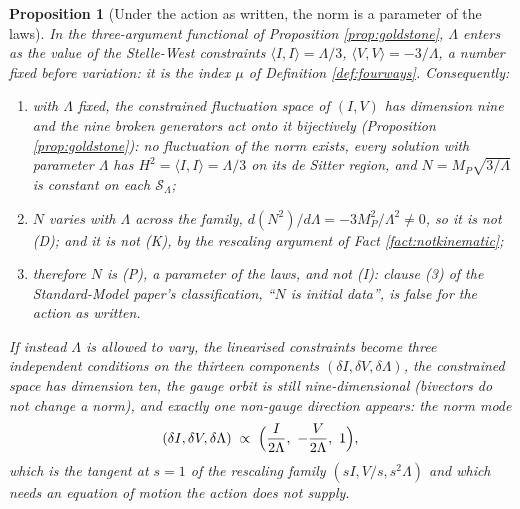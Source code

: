 \documentclass[11pt]{article}
\newtheorem{proposition}[theorem]{Proposition}
\theoremstyle{definition}
\newcommand{\ip}[2]{\langle #1, #2\rangle}
\begin{document}
\begin{proposition}[Under the action as written, the norm is a parameter of the laws]\label{prop:parameter}
In the three-argument functional of Proposition \ref{prop:goldstone}, $\Lambda$ enters as the value of the Stelle-West constraints $\ip{I}{I} = \Lambda/3$, $\ip{V}{V} = -3/\Lambda$, a number fixed before variation: it is the index $\mu$ of Definition \ref{def:fourways}. Consequently:
\begin{enumerate}
\item[(i)] with $\Lambda$ fixed, the constrained fluctuation space of $(I, V)$ has dimension nine and the nine broken generators act onto it bijectively (Proposition \ref{prop:goldstone}): no fluctuation of the norm exists, every solution with parameter $\Lambda$ has $H^2 = \ip{I}{I} = \Lambda/3$ on its de Sitter region, and $N = M_P\sqrt{3/\Lambda}$ is constant on each $\mathcal{S}_\Lambda$;
\item[(ii)] $N$ varies with $\Lambda$ across the family, $d(N^2)/d\Lambda = -3M_P^2/\Lambda^2 \neq 0$, so it is not (D); and it is not (K), by the rescaling argument of Fact \ref{fact:notkinematic};
\item[(iii)] therefore $N$ is (P), a parameter of the laws, and not (I): clause (3) of the Standard-Model paper's classification, ``$N$ is initial data'', is false for the action as written.
\end{enumerate}
If instead $\Lambda$ is allowed to vary, the linearised constraints become three independent conditions on the thirteen components $(\delta I, \delta V, \delta\Lambda)$, the constrained space has dimension ten, the gauge orbit is still nine-dimensional (bivectors do not change a norm), and exactly one non-gauge direction appears: the norm mode
\[
(\delta I, \delta V, \delta\Lambda) \;\propto\; \Bigl(\frac{I}{2\Lambda},\ -\frac{V}{2\Lambda},\ 1\Bigr),
\]
which is the tangent at $s = 1$ of the rescaling family $(sI, V/s, s^2\Lambda)$ and which needs an equation of motion the action does not supply.
\end{proposition}
\end{document}

